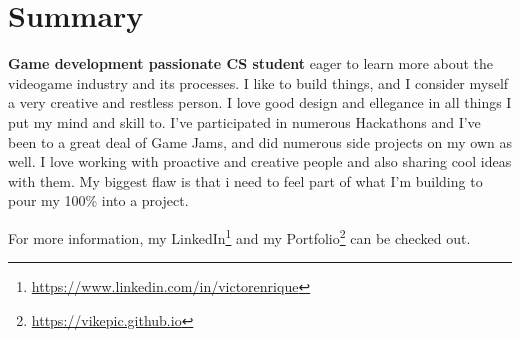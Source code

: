\section{Summary}

\textbf{Game development passionate CS student} eager to learn more about the videogame industry and its processes. I like to build things, and I consider myself a very creative and restless person. I love good design and ellegance in all things I put my mind and skill to. I've participated in numerous Hackathons and I've been to a great deal of Game Jams, and did numerous side projects on my own as well. I love working with proactive and creative people and also sharing cool ideas with them. My biggest flaw is that i need to feel part of what I'm building to pour my 100\% into a project.

For more information, my LinkedIn\footnote{\url{https://www.linkedin.com/in/victorenrique}} and my Portfolio\footnote{\url{https://vikepic.github.io}} can be checked out.
